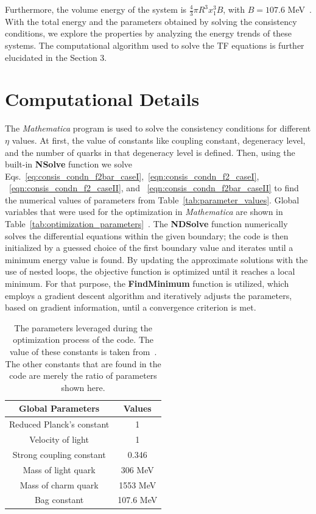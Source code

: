 \documentclass[preprint,12pt]{elsarticle}
\begin{document}
        Furthermore, the volume energy of the system is $\frac{4}{3} \pi R^{3} x_{1}^3 B$, with $B = 107.6$ MeV~\cite{Baral:2019qpl}. With the total energy and the parameters obtained by solving the consistency conditions, we explore the properties by analyzing the energy trends of these systems. The computational algorithm used to solve the TF equations is further
        elucidated in the Section 3.
        
\section{Computational Details}
    \label{sec:computational_details}
        The {\it Mathematica} program is used to solve the consistency conditions for different $\eta$ values. At first, the value of constants like coupling constant, degeneracy level, and the number of quarks in that degeneracy level is defined. Then,  using the built-in \textbf{NSolve} function we solve Eqs.~\eqref{eq:consis_condn_f2bar_caseI},~\eqref{eqn:consis_condn_f2_caseI}, ~\eqref{eqn:consis_condn_f2_caseII}, and ~\eqref{eqn:consis_condn_f2bar_caseII} to find the numerical values of parameters from Table~\eqref{tab:parameter_values}. Global variables that were used for the optimization in {\it Mathematica} are shown in Table~\eqref{tab:optimization_parameters}~\cite{Baral:2019qpl}.
       The \textbf{NDSolve} function numerically solves the differential equations within the given boundary; the code is then initialized by a guessed choice of the first boundary value and iterates until a minimum energy value is found. By updating the approximate solutions with the use of nested loops, the objective function is optimized until it reaches a local minimum. For that purpose, the \textbf{FindMinimum} function is utilized, which employs a gradient descent algorithm and iteratively adjusts the parameters, based on gradient information, until a convergence criterion is met. 
        \begin{table}
    \centering
    \caption{The parameters leveraged during the optimization process of the code. The value of these constants is taken from~\cite{Baral:2019qpl}. The other constants that are found in the code are merely the ratio of parameters shown here.}
             \begin{tabular}{c c  }
                        \hline
                        Global Parameters & Values  \\
                        \hline
                        Reduced Planck's constant & 1 \\
                        Velocity of light & 1 \\
                        Strong coupling constant & 0.346 \\
                        Mass of light quark & 306 MeV \\
                        Mass of charm quark & 1553 MeV \\
                        Bag constant & 107.6 MeV \\
                        \hline
                        \end{tabular}
                \label{tab:optimization_parameters}        
                \end{table}
\end{document}
